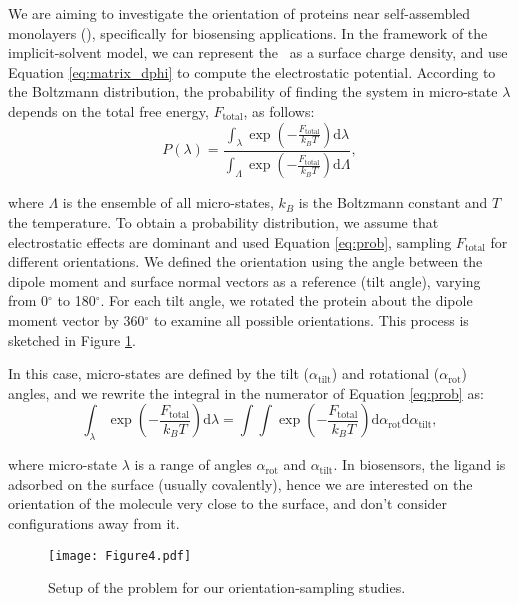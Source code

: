 
We are aiming to investigate the orientation of proteins near self-assembled monolayers (\sam), specifically for biosensing applications. In the framework of the implicit-solvent model, we can represent the \sam\ as a surface charge density, and use Equation \eqref{eq:matrix_dphi} to compute the electrostatic potential. 
According to the Boltzmann distribution, the probability of finding the system in micro-state $\lambda$ depends on the total free energy, $F_\text{total}$, as follows:
%
\begin{equation} \label{eq:prob}
P(\lambda) = \frac{\int_{\lambda} \exp \left(-\frac{F_\text{total}}{k_B T} \right) \text{d} \lambda}{\int_{\Lambda} \exp \left(-\frac{F_\text{total}}{k_B T} \right) \text{d} \Lambda},
\end{equation} 

\noindent where $\Lambda$ is the ensemble of all micro-states, $k_B$ is the Boltzmann constant and $T$ the temperature. To obtain a probability distribution, we assume that electrostatic effects are dominant and used Equation \eqref{eq:prob}, sampling $F_\text{total}$ for different orientations. We defined the orientation using the angle between the dipole moment and surface normal vectors as a reference (tilt angle), varying from 0$^\circ$ to 180$^\circ$. For each tilt angle, we rotated the protein about the dipole moment vector by 360$^\circ$ to examine all possible orientations. This process is sketched in Figure \ref{fig:1pgb_orientation}.

In this case, micro-states are defined by the tilt ($\alpha_{\text{tilt}}$) and rotational ($\alpha_{\text{rot}}$) angles, and we rewrite the integral in the numerator of Equation \eqref{eq:prob} as:
%
\begin{equation} \label{eq:prob_angle}
\int_{\lambda} \exp \left(-\frac{F_\text{total}}{k_B T} \right) \text{d} \lambda = \int \int \exp \left(-\frac{F_\text{total}}{k_B T} \right) \text{d} \alpha_{\text{rot}} \text{d} \alpha_{\text{tilt}},
\end{equation}

\noindent where micro-state $\lambda$ is a range of angles $\alpha_{\text{rot}}$ and $\alpha_{\text{tilt}}$. 
In biosensors, the ligand is adsorbed on the surface (usually covalently), hence we are interested on the orientation of the molecule very close to the surface, and don't consider configurations away from it.  


\begin{figure}%
   \centering
   \texttt{[image: Figure4.pdf]}
   \caption{Setup of the problem for our orientation-sampling studies.}
   \label{fig:1pgb_orientation}
\end{figure}


